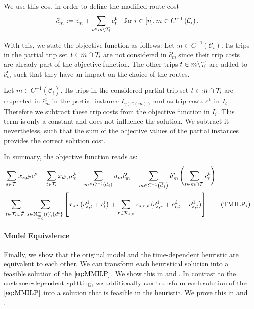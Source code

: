 We use this cost in order to define the modified route cost
\begin{align*}
	\hat{c}^{\operatorname{r}}_m := c^{\operatorname{r}}_m + \sum_{t\in m\backslash\mathcal{T}_i}c^{\operatorname{t}}_t && \text{for } i\in[n], m\in C^{-1}\left(\mathcal{C}_i\right).
\end{align*}

With this, we state the objective function as follows: Let ${m\in C^{-1}\left(\mathcal{C}_i\right)}$. Its trips in the partial trip set ${t\in m\cap\mathcal{T}_i}$ are not considered in $\hat{c}^{\operatorname{r}}_m$ since their trip costs are already part of the objective function. The other trips ${t\in m\backslash\mathcal{T}_i}$ are added to $\hat{c}^{\operatorname{r}}_m$ such that they have an impact on the choice of the routes.

Let ${m\in C^{-1}\left(\overline{\mathcal{C}}_i\right)}$. Its trips in the considered partial trip set ${t\in m\cap\mathcal{T}_i}$ are respected in $\hat{c}^{\operatorname{r}}_m$ in the partial instance $I_{\gamma(C(m))}$ and as trip costs $c^{\operatorname{t}}$ in $I_i$. Therefore we subtract these trip costs from the objective function in $I_i$. This term is only a constant and does not influence the solution. We subtract it nevertheless, such that the sum of the objective values of the partial instances provides the correct solution cost.

In summary, the objective function reads as:
\begin{align}
	& \sum_{s\in\Ti} x_{s,\de}\cv + \sum_{t\in\Ti} x_{\ds, t}\ct_t + \sum_{m\in C^{-1}\left(\mathcal{C}_i\right)} u_m \hat{c}^{\operatorname{r}}_m - \sum_{m\in C^{-1}\left(\overline{\mathcal{C}}_i\right)} \hat{u}^i_m \left(\sum_{t\in m\cap\Ti} \ct_t\right)\nonumber \\
	& \sum_{t\in\Ti\cup\Phat_i}\sum_{s\in\Ninoi(t)\backslash\left\{\ds\right\}}\left[x_{s,t}\left(\cd_{s,t}+\ct_t\right)+\sum_{r\in\Rst}z_{s,r,t}\left(\cd_{s,r}+\cd_{r,t}-\cd_{s,t}\right)\right] \tag{$\operatorname{TMILP}_i$} \label{eq:TMILPi}
\end{align}

\paragraph{Model Equivalence} \parfill

Finally, we show that the original model and the time-dependent heuristic are equivalent to each other. We can transform each heuristical solution into a feasible solution of the $\eqref{eq:MMILP}$. We show this in  and . In contrast to the customer-dependent splitting, we additionally can transform each solution of the $\eqref{eq:MMILP}$ into a solution that is feasible in the heuristic. We prove this in  and .

